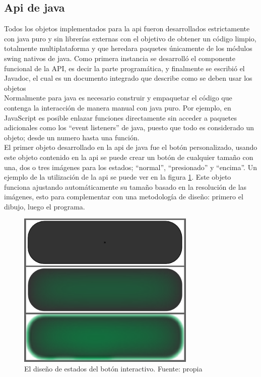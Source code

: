 \subsection{Api de java}
Todos los objetos implementados para la api fueron desarrollados estrictamente con java puro y sin librerías externas con el objetivo de obtener un código limpio, totalmente multiplataforma y que heredara paquetes únicamente de los módulos swing nativos de java. Como primera instancia se desarrolló el componente funcional de la API, es decir la parte programática, y finalmente se escribió el Javadoc, el cual es un documento integrado que describe como se deben usar los objetos 
\vspace{0.5cm}\\
Normalmente para java es necesario construir y empaquetar el código que contenga la interacción de manera manual con java puro. Por ejemplo, en JavaScript es posible enlazar funciones directamente sin acceder a paquetes adicionales como los ``event listeners'' de java, puesto que todo es considerado un objeto; desde un numero hasta una función.	
\vspace{0.5cm}\\
El primer objeto desarrollado en la api de java fue el botón personalizado, usando este objeto contenido en la api se puede crear un botón de cualquier tamaño con una, dos o tres imágenes para los estados; ``normal'', ``presionado'' y ``encima''. Un ejemplo de la utilización de la api se puede ver en la figura \ref{fig_2}. Este objeto funciona ajustando automáticamente su tamaño basado en la resolución de las imágenes, esto para complementar con una metodología de diseño: primero el dibujo, luego el programa.

\begin{figure}[htbp]
	\centerline{\includegraphics[width=8.5cm]{./figuras/boton.png}}
	\caption{El diseño de estados del botón interactivo. Fuente: propia}
	\label{fig_2}
\end{figure}


